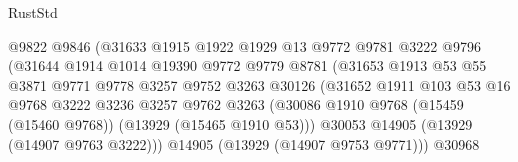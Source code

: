 \begin{lexlean}{RustStd}
\begin{coremodule}
                                      @9822
                                      @9846
                                      (@31633
                                        @1915
                                        @1922
                                        @1929
                                        @13
                                        @9772
                                        @9781
                                        @3222
                                        @9796
                                        (@31644
                                          @1914
                                          @1014
                                          @19390
                                          @9772
                                          @9779
                                          @8781
                                          (@31653
                                            @1913
                                            @53
                                            @55
                                            @3871
                                            @9771
                                            @9778
                                            @3257
                                            @9752
                                            @3263
                                            @30126
                                            (@31652
                                              @1911
                                              @103
                                              @53
                                              @16
                                              @9768
                                              @3222
                                              @3236
                                              @3257
                                              @9762
                                              @3263
                                              (@30086
                                                @1910
                                                @9768
                                                (@15459 (@15460 @9768))
                                                (@13929 (@15465 @1910 @53)))
                                              @30053
                                              @14905
                                              (@13929 (@14907 @9763 @3222)))
                                            @14905
                                            (@13929 (@14907 @9753 @9771)))
                                          @30968

\end{coremodule}
\end{lexlean}
